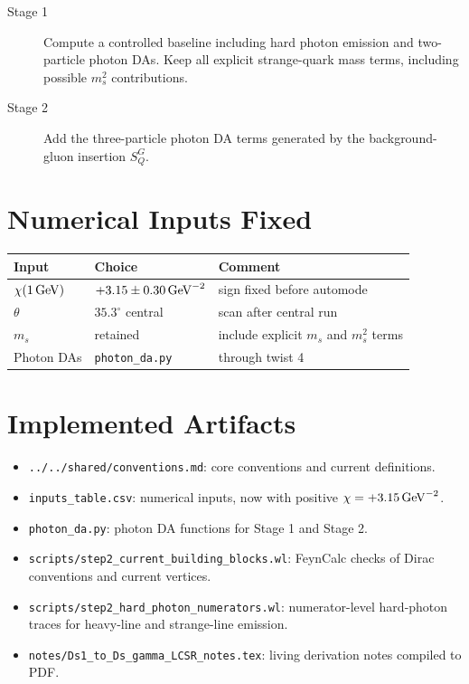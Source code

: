 \documentclass[11pt]{article}
\begin{document}
\begin{description}
  \item[Stage 1] Compute a controlled baseline including hard photon emission
  and two-particle photon DAs.  Keep all explicit strange-quark mass terms,
  including possible $m_s^2$ contributions.

  \item[Stage 2] Add the three-particle photon DA terms generated by the
  background-gluon insertion $S_Q^G$.
\end{description}

\section{Numerical Inputs Fixed}

\begin{center}
\begin{tabular}{lll}
\toprule
Input & Choice & Comment\\
\midrule
$\chi(1\,{\rm GeV})$ & $+3.15\pm0.30\,{\rm GeV}^{-2}$ & sign fixed before automode\\
$\theta$ & $35.3^\circ$ central & scan after central run\\
$m_s$ & retained & include explicit $m_s$ and $m_s^2$ terms\\
Photon DAs & \texttt{photon\_da.py} & through twist 4\\
\bottomrule
\end{tabular}
\end{center}

\section{Implemented Artifacts}

\begin{itemize}
  \item \texttt{../../shared/conventions.md}: core conventions and current definitions.
  \item \texttt{inputs\_table.csv}: numerical inputs, now with positive
  $\chi=+3.15\,{\rm GeV}^{-2}$.
  \item \texttt{photon\_da.py}: photon DA functions for Stage 1 and Stage 2.
  \item \texttt{scripts/step2\_current\_building\_blocks.wl}: FeynCalc checks
  of Dirac conventions and current vertices.
  \item \texttt{scripts/step2\_hard\_photon\_numerators.wl}: numerator-level
  hard-photon traces for heavy-line and strange-line emission.
  \item \texttt{notes/Ds1\_to\_Ds\_gamma\_LCSR\_notes.tex}: living derivation
  notes compiled to PDF.
\end{itemize}
\end{document}
